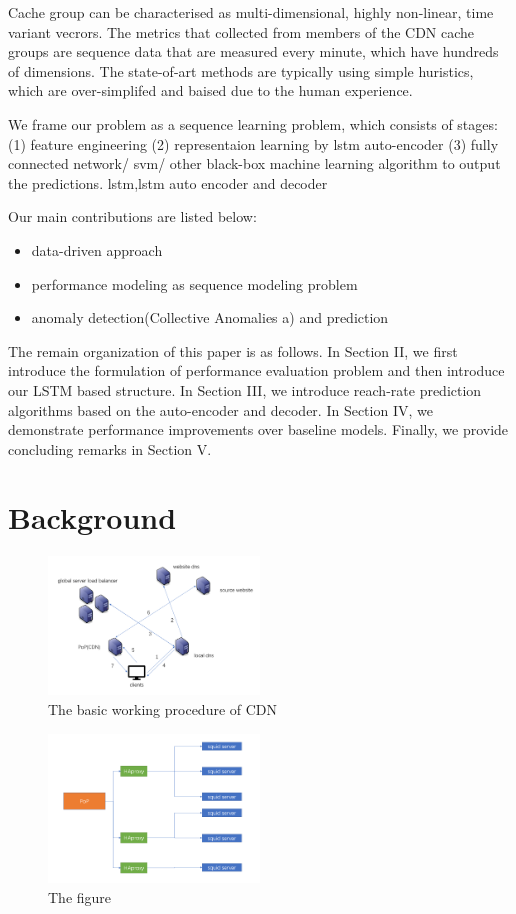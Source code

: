\documentclass[5p]{elsarticle}
\begin{document}
Cache group can be characterised as multi-dimensional, highly non-linear, time variant vecrors. The metrics that collected from members of the CDN cache groups are sequence data that are measured every minute, which have hundreds of dimensions. The state-of-art methods are typically using simple huristics, which are over-simplifed and baised due to the human experience. 

We frame our problem as a sequence learning problem, which consists of stages: (1) feature engineering (2) representaion learning by lstm auto-encoder (3) fully connected network/ svm/ other black-box machine learning algorithm to output the predictions. 
lstm,lstm auto encoder and decoder

Our main contributions are listed below:
\begin{itemize}
  \item data-driven approach
  \item performance modeling as sequence modeling problem
  \item anomaly detection(Collective Anomalies a) and prediction
\end{itemize}

The remain organization of this paper is as follows. In Section II, we first  introduce the formulation of performance evaluation problem and  then introduce  our LSTM  based  structure. In Section III, we introduce reach-rate prediction algorithms based on the
auto-encoder and decoder. In Section IV, we demonstrate performance  improvements over baseline models. Finally, we provide concluding remarks in Section V.
\section{Background}
\begin{figure}[h]
    \centering
    \includegraphics[width=0.5\textwidth]{CDN_new.png}
    \caption{The basic working procedure of CDN}
    \label{fig}
\end{figure}

\begin{figure}[h]
    \centering
    \includegraphics[width=0.5\textwidth]{cache_group.png}
    \caption{The figure}
    \label{fig: the structure of PoP}
\end{figure}
\end{document}
